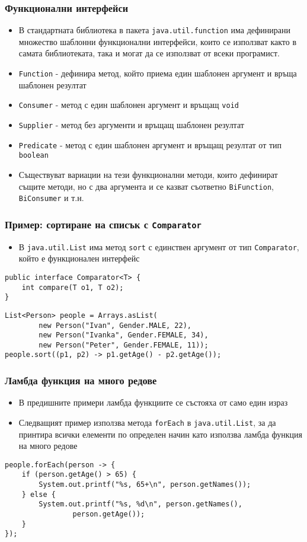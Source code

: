 \documentclass[ignorenonframetext, hyperref=unicode,compress,pdflatex]{beamer}
\begin{document}
\begin{frame}[containsverbatim]\frametitle{Функционални интерфейси}
\begin{itemize}
  \item В стандартната библиотека в пакета \lstinline{java.util.function} има
  дефинирани множество шаблонни функционални интерфейси, които се използват както в самата библиотеката, така
  и могат да се използват от всеки програмист.
  \item \lstinline{Function} - дефинира метод, който приема един шаблонен
  аргумент и връща шаблонен резултат
  \item \lstinline{Consumer} - метод с един шаблонен
  аргумент и връщащ \lstinline{void}
  \item \lstinline{Supplier} - метод без аргументи и връщащ
  шаблонен резултат
  \item \lstinline{Predicate} - метод с един шаблонен
  аргумент и връщащ резултат от тип \lstinline{boolean}
  \item Съществуват вариации на тези функционални методи, които дефинират същите
  методи, но с два аргумента и се казват съответно \lstinline{BiFunction},
  \lstinline{BiConsumer} и т.н.
\end{itemize}
\end{frame}

\begin{frame}[containsverbatim]\frametitle{Пример: сортиране на списък с
\lstinline{Comparator}}
\begin{itemize}
  \item В \lstinline{java.util.List} има метод \lstinline{sort} с единствен
  аргумент от тип \lstinline{Comparator}, който е функционален интерфейс
\end{itemize}
\begin{lstlisting}
public interface Comparator<T> {
	int compare(T o1, T o2);
}
\end{lstlisting}
\begin{lstlisting}
List<Person> people = Arrays.asList(
		new Person("Ivan", Gender.MALE, 22),
		new Person("Ivanka", Gender.FEMALE, 34),
		new Person("Peter", Gender.FEMALE, 11));
people.sort((p1, p2) -> p1.getAge() - p2.getAge());
\end{lstlisting}
\end{frame}

\begin{frame}[containsverbatim]\frametitle{Ламбда функция на много редове}
\begin{itemize}
  \item В предишните примери ламбда функциите се състояха от само един израз
  \item Следващият пример използва метода \lstinline{forEach} в
  \lstinline{java.util.List}, за да принтира всички елементи по определен начин
  като използва ламбда функция на много редове
\end{itemize}
\begin{lstlisting}
people.forEach(person -> {
	if (person.getAge() > 65) {
		System.out.printf("%s, 65+\n", person.getNames());
	} else {
		System.out.printf("%s, %d\n", person.getNames(),
				person.getAge());
	}
});
\end{lstlisting}
\end{frame}
\end{document}
